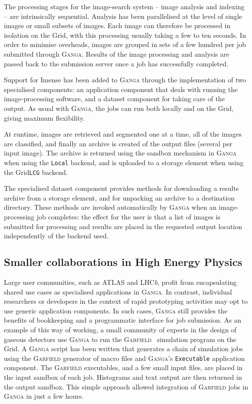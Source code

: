 \documentclass{elsart}
\def\lhcb {LHC{\em b\/}\xspace}
\def\atlas {ATLAS\xspace}
\def\ganga {\textsc{Ganga}\xspace}
\def\garfield {\textsc{Garfield}\xspace}
\def\grid {Grid\xspace}
\newcommand{\code}[1]{\texttt{#1}}
\begin{document}
The processing stages for the image-search system -- image analysis
and indexing -- are intrinsically sequential.  Analysis has been parallelised
at the level of single
images or small subsets of images. Each image can therefore be processed in
isolation on the \grid, with this processing usually taking a few to ten
seconds.  In order to minimise overheads, images are grouped in sets of
a few hundred per job submitted through \ganga.  Results of the image
processing and analysis are passed back to the submission server once a
job has successfully completed.

Support for Imense has been added to \ganga through the implementation of two
specialised components: an application component that deals with running the
image-processing software, and a dataset component for taking care of
the output. As usual with \ganga, the jobs can run both locally and on the
\grid, giving maximum flexibility.

At runtime, images are retrieved and segmented one at a time, all of the
images are classified, and finally an archive is created of the output files
(several per input image).  The archive is returned using the sandbox
mechanism in \ganga when using the \code{Local} backend, and is uploaded to a
storage element when using the \grid \code{LCG} backend.

The specialised dataset component provides methods for downloading a results
archive from a storage element, and for unpacking an archive to a destination
directory. These methods are invoked automatically by \ganga when an
image-processing job completes: the effect for the user is that a list of
images is submitted for processing and results are placed in the requested
output location independently of the backend used.

\subsection{Smaller collaborations in High Energy Physics}
\label{sec:smallHEP}
Large user communities, such as \atlas and \lhcb, profit from encapsulating
shared use cases as specialised applications in \ganga. In contrast,
individual researchers or developers in the context of rapid prototyping
activities may opt to use generic application components.
In such cases, \ganga still provides the benefits of
bookkeeping and a programmatic interface for job submission. As an example of
this way of working, a small
community of experts in the design of gaseous detectors
use \ganga to run the \garfield~\cite{Garfield} simulation program on the
\grid.  A \ganga script has been written that generates a chain of
simulation jobs
using the \garfield generator of macro files and \ganga's \code{Executable}
application component.  The \garfield executables, and a few small input files,
are placed in
the input sandbox of each job. Histograms and text output are then returned
in the
output sandbox. This simple approach allowed integration of
\garfield jobs in \ganga in just a few hours.
\end{document}
